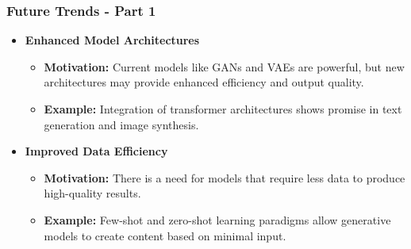 \documentclass[aspectratio=169]{beamer}
\begin{document}
\begin{frame}[fragile]
    \frametitle{Future Trends - Part 1}
    \begin{itemize}
        \item \textbf{Enhanced Model Architectures}
            \begin{itemize}
                \item \textbf{Motivation:} Current models like GANs and VAEs are powerful, but new architectures may provide enhanced efficiency and output quality.
                \item \textbf{Example:} Integration of transformer architectures shows promise in text generation and image synthesis.
            \end{itemize}
        \item \textbf{Improved Data Efficiency}
            \begin{itemize}
                \item \textbf{Motivation:} There is a need for models that require less data to produce high-quality results.
                \item \textbf{Example:} Few-shot and zero-shot learning paradigms allow generative models to create content based on minimal input.
            \end{itemize}
    \end{itemize}
\end{frame}
\end{document}
